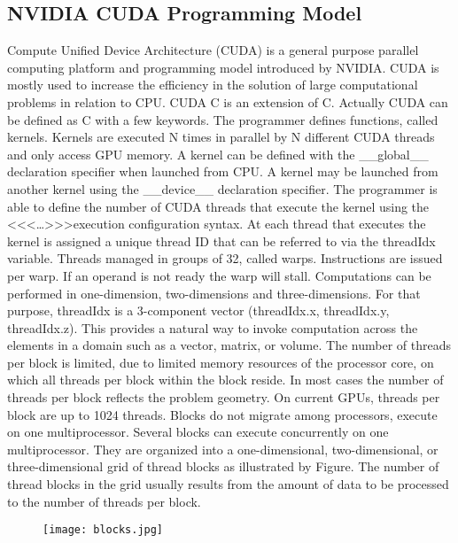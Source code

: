 \subsection{NVIDIA CUDA Programming Model}
Compute Unified Device Architecture (CUDA) is a general purpose parallel computing platform and programming model introduced by NVIDIA. CUDA is mostly used to increase the efficiency in the solution of large computational problems in relation to CPU.
CUDA C is an extension of C. Actually CUDA can be defined as C with a few keywords. The programmer defines functions, called kernels. Kernels are executed N times in parallel by N different CUDA threads and only access GPU memory. A kernel can be defined with the \_\_global\_\_ declaration specifier when launched from CPU. A kernel may be launched from another kernel using the \_\_device\_\_ declaration specifier. The programmer is able to define the number of CUDA threads that execute the kernel using the <<<…>>>execution configuration syntax. At each thread that executes the kernel is assigned a unique thread ID that can be referred to via the threadIdx variable. Threads managed in groups of 32, called warps. Instructions are issued per warp. If an operand is not ready the warp will stall. Computations can be performed in one-dimension, two-dimensions and three-dimensions. For that purpose, threadIdx is a 3-component vector (threadIdx.x, threadIdx.y, threadIdx.z). This provides a natural way to invoke computation across the elements in a domain such as a vector, matrix, or volume. The number of threads per block is limited, due to limited memory resources of the processor core, on which all threads per block within the block reside. In most cases the number of threads per block reflects the problem geometry. On current GPUs, threads per block are up to 1024 threads. Blocks do not migrate among processors, execute on one multiprocessor. Several blocks can execute concurrently on one multiprocessor. They are organized into a one-dimensional, two-dimensional, or three-dimensional grid of thread blocks as illustrated by Figure. The number of thread blocks in the grid usually results from the amount of data to be processed to the number of threads per block. 
 \begin{figure}[H]
    \centering
        \texttt{[image: blocks.jpg]}
    \caption{}
    \label{fig:warp_scheduler}
\end{figure}


